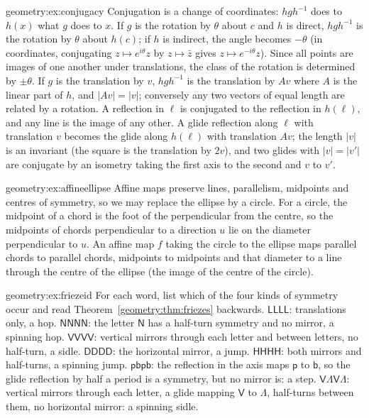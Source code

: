 \begin{solution}{geometry:ex:conjugacy}
\idea Conjugation is a change of coordinates: $hgh^{-1}$ does to $h(x)$ what $g$ does to $x$.
\writeup If $g$ is the rotation by $\theta$ about $c$ and $h$ is direct, $hgh^{-1}$ is the rotation by $\theta$ about $h(c)$; if $h$ is indirect, the
angle becomes $-\theta$ (in coordinates, conjugating $z\mapsto e^{i\theta}z$ by $z\mapsto\bar z$ gives $z\mapsto e^{-i\theta}z$). Since all points are images of one another under translations, the class of the rotation is determined by $\pm\theta$. If
$g$ is the translation by $v$, $hgh^{-1}$ is the translation by $Av$ where $A$ is the linear part of $h$, and $|Av|=|v|$; conversely any two
vectors of equal length are related by a rotation. A reflection in $\ell$ is conjugated to the reflection in $h(\ell)$, and any line is the
image of any other. A glide reflection along $\ell$ with translation $v$ becomes the glide along $h(\ell)$ with translation $Av$; the length
$|v|$ is an invariant (the square is the translation by $2v$), and two glides with $|v|=|v'|$ are conjugate by an isometry taking the first
axis to the second and $v$ to $v'$.
\end{solution}

\begin{solution}{geometry:ex:affineellipse}
\idea Affine maps preserve lines, parallelism, midpoints and centres of symmetry, so we may replace the ellipse by a circle.
\writeup For a circle, the midpoint of a chord is the foot of the perpendicular from the centre, so the midpoints of chords perpendicular to a
direction $u$ lie on the diameter perpendicular to $u$. An affine map $f$ taking the circle to the ellipse maps parallel chords to parallel
chords, midpoints to midpoints and that diameter to a line through the centre of the ellipse (the image of the centre of the circle).
\end{solution}

\begin{solution}{geometry:ex:friezeid}
\idea For each word, list which of the four kinds of symmetry occur and read Theorem~\ref{geometry:thm:friezes} backwards.
\writeup $\mathsf{LLLL}$: translations only, a hop. $\mathsf{NNNN}$: the letter $\mathsf N$ has a half-turn symmetry and no mirror, a spinning hop.
$\mathsf{VVVV}$: vertical mirrors through each letter and between letters, no half-turn, a sidle. $\mathsf{DDDD}$: the horizontal mirror, a
jump. $\mathsf{HHHH}$: both mirrors and half-turns, a spinning jump. $\mathsf{pbpb}$: the reflection in the axis maps $\mathsf p$ to $\mathsf b$, so
the glide reflection by half a period is a symmetry, but no mirror is: a step. $\mathsf{V\Lambda V\Lambda}$: vertical mirrors through each
letter, a glide mapping $\mathsf V$ to $\Lambda$, half-turns between them, no horizontal mirror: a spinning sidle.
\end{solution}

